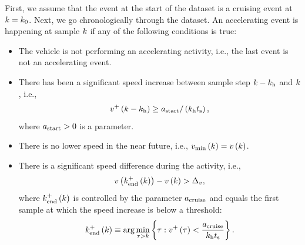 First, we assume that the event at the start of the dataset is a cruising event at $k=k_{0}$. Next, we go chronologically through the dataset. An accelerating event is happening at sample $k$ if any of the following conditions is true:
\begin{itemize}
	\item The vehicle is not performing an accelerating activity, i.e., the last event is not an accelerating event.
	\item \cstarta There has been a significant speed increase between sample step $k-k_{\mathrm{h}}$ and $k$, i.e., 
	\begin{equation}
		\label{eq:start acceleration}
		v^{+}\left(k-k_{\mathrm{h}}\right) \geq a_\mathrm{start} / \left( k_{\mathrm{h}}t_\mathrm{s} \right),
	\end{equation} \cenda
	where $a_\mathrm{start}>0$ is a parameter.
	\item There is no lower speed in the near future, i.e., $v_\mathrm{min}\left(k\right)=v\left(k\right)$.
	\item There is a significant speed difference during the activity, i.e., 
	\begin{equation}
		v\left(k_{\mathrm{end}}^{+}\left(k\right)\right) - v\left(k\right) > \Delta_{v},
	\end{equation}
	where $k_{\mathrm{end}}^{+}\left(k\right)$ is controlled by the parameter $a_\mathrm{cruise}$ and \cstarta equals the first sample at which the speed increase is below a threshold\cenda:
	\begin{equation}
		\label{eq:end acceleration}
		k_{\mathrm{end}}^{+}\left(k\right) \equiv \arg \min_{\tau > k} \left\{ \tau: v^{+}\left(\tau\right) < \frac{a_\mathrm{cruise}}{k_{\mathrm{h}}t_\mathrm{s}} \right\}.
	\end{equation}
\end{itemize}

